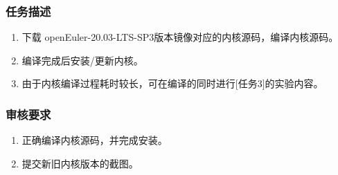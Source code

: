 \documentclass{article}
\begin{document}
\subsubsection{任务描述}
\begin{enumerate}
    \item 下载 openEuler-20.03-LTS-SP3版本镜像对应的内核源码，编译内核源码。
    \item 编译完成后安装/更新内核。
    \item 由于内核编译过程耗时较长，可在编译的同时进行[任务3]的实验内容。
\end{enumerate}
\subsubsection{审核要求}
\begin{enumerate}
    \item 正确编译内核源码，并完成安装。
    \item 提交新旧内核版本的截图。
\end{enumerate}
\end{document}
